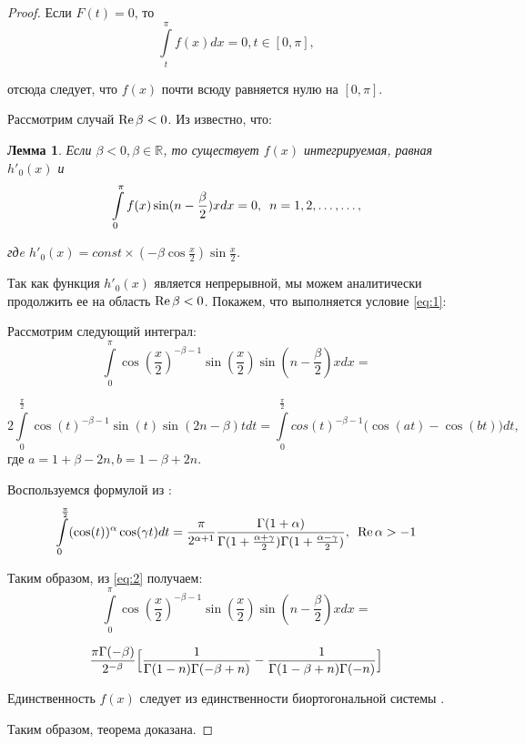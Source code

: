 ﻿\documentclass[oneside, final, 14pt]{extreport}
\newtheorem{lemma}{Лемма}
\begin{document}
\begin{proof}
		Если $F(t) = 0$, то 
		$$
			\int\limits_t^\pi f(x)dx = 0, t \in [0, \pi],
		$$
		
		отсюда следует, что $f(x)$ почти всюду равняется нулю на $[0, \pi]$.
		
		Рассмотрим случай $\operatorname{Re}\beta < 0$. Из \cite{moi:gul} известно, что:
		\begin{lemma}
			Если $\beta < 0, \beta\in\mathbb{R}$, то существует $f(x)$ интегрируемая, равная $h'_0(x)$ и 
			$$
				\int\limits_0^{\pi}f(x)\sin(n - \frac{\beta}{2})xdx = 0, \enspace n = 1, 2, \dots, \dots,
			$$
			
			гдe $h'_0(x) = const \times (-\beta\cos\frac{x}{2})\sin\frac{x}{2}$.
		\end{lemma}
		
		Так как функция $h'_0(x)$ является непрерывной, мы можем аналитически продолжить ее на область 
		$\operatorname{Re}\beta < 0$. Покажем, что выполняется условие \eqref{eq:1}:
		
		 Рассмотрим следующий интеграл:
		$$
			\int\limits_0^\pi\cos(\frac{x}{2})^{-\beta - 1}\sin(\frac{x}{2})\sin(n - \frac{\beta}{2})xdx = 
		$$
		
		\begin{equation}
			2\int\limits_0^\frac{\pi}{2}\cos(t)^{-\beta - 1}\sin(t)\sin(2n - \beta)tdt 
			= \int\limits_0^\frac{\pi}{2}cos(t)^{-\beta-1}\bigl(\cos(at) - \cos(bt)\bigr)dt,	\tag{2} \label{eq:2}
		\end{equation}
		где $a =1 + \beta - 2n, b = 1 - \beta + 2n.$
		
		
		
		\bigskip
		
		Воспользуемся формулой из \cite{bateman}:
		$$
			\int\limits_0^\frac{\pi}{2}(\cos(t))^\alpha \cos(\gamma t)dt = \frac{\pi}{2^{\alpha + 1}}
			\frac{\Gamma(1 + \alpha)}{\Gamma(1 + \frac{\alpha + \gamma}{2})\Gamma(1 + \frac{\alpha - \gamma}{2})},
			\enspace\operatorname{Re}\alpha > -1
		$$
		
		Таким образом, из \eqref{eq:2} получаем:
		$$
			\int\limits_0^\pi\cos(\frac{x}{2})^{-\beta - 1}\sin(\frac{x}{2})\sin(n - \frac{\beta}{2})xdx = 
		$$
		
		$$
			\frac{\pi\Gamma(-\beta)}{2^{-\beta}}\Bigl[\frac{1}{\Gamma(1 - n)\Gamma(-\beta + n)} - 
			\frac{1}{\Gamma(1 -\beta + n)\Gamma(- n)}\Bigr]
		$$
		
		Единственность $f(x)$ следует из единственности биортогональной системы \cite{moiseev-dan}.
		
		Таким образом, теорема доказана.
		
	\end{proof}
\end{document}
